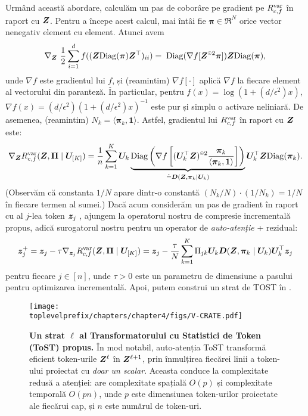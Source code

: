 \documentclass[../../book-main_ro.tex]{subfiles}
\begin{document}
Urmând această abordare, calculăm un pas de coborâre pe gradient pe $R_{c,f}^{\rm var}$ în raport cu $\bm{Z}$.
Pentru a începe acest calcul, mai întâi fie $\bm \pi \in \Re^N$ orice vector nenegativ element cu element. Atunci avem
\begin{equation}\label{eq1:grad Rcf}
\nabla_{\Z} \ \frac{1}{2} \sum_{i = 1}^{d} f(  (\Z \mathrm{Diag}(\bm \pi) \Z^{\top} )_{ii}) %
= \; \mathrm{Diag}(\nabla f[ \Z^{\hada 2} \bm \pi] ) \Z \mathrm{Diag}(\bm \pi),
\end{equation}
unde $\nabla f$ este gradientul lui $f$, și (reamintim) $\nabla f[\cdot]$ aplică $\nabla f$ la fiecare element al vectorului din paranteză. În particular, pentru $ f(x) = \log(1 + (d/\epsilon^{2}) x)$, $\nabla f(x) = (d / \epsilon^{2}) (1+ (d / \epsilon^{2}) x)^{-1}$ este pur și simplu o activare neliniară. De asemenea, (reamintim) $N_{k} = \langle \bm \pi_{k}, \bm 1\rangle$. Astfel, gradientul lui $R^{\rm var}_{c,f}$ în raport cu $\bm{Z}$ este:
\begin{align}\label{eq2:grad Rcf}
    \nabla_{\Z} R^{\rm var}_{c,f}(\Z,\bm \Pi \mid \bm U_{[K]}) =  \frac{1}{n}
    \sum_{k=1}^K \bm U_{k} \underbrace{\mathrm{Diag} \left( \nabla f\left[ (\bm
    U_{k}^{\top} \Z)^{\hada 2}  \frac{\bm \pi_k}{\langle \bm \pi_{k}, \bm 1\rangle} \right] \right)}_{\doteq \bm D(\Z, \bm \pi_{k} \mid \bm U_{k})} \bm U_{k}^{\top} \Z \mathrm{Diag}(\bm \pi_k).
\end{align}
(Observăm că constanta $1/N$ apare dintr-o constantă $(N_{k}/N)\cdot (1/N_{k}) = 1/N$ în fiecare termen al sumei.) Dacă acum considerăm un pas de gradient în raport cu al $j$-lea token $\bm{z}_j$
, ajungem la operatorul nostru de compresie incrementală propus, adică surogatorul nostru pentru un operator de \textit{auto-atenție} + rezidual:
\vspace{-2mm}
\begin{equation}\label{eq:layer-operation-orig}
    \bm{z}_j^+ = \bm{z}_{j} - \tau \nabla_{\bm{z}_{j}}R_{c, f}^{\rm var}(\bm{Z}, \bm \Pi \mid \bm U_{[K]}) = \bm{z}_j - \frac{\tau}{N} \sum_{k=1}^K \Pi_{jk} \bm U_{k} \bm D(\bm{Z}, \bm \pi_{k} \mid \bm U_{k}) \bm U_{k}^{\top} \bm{z}_j
\end{equation}
pentru fiecare \(j \in [n]\), unde $\tau > 0$ este un parametru de dimensiune a pasului pentru optimizarea incrementală. Apoi, putem construi un strat de TOST în .

\begin{figure}[t]
    \centering \texttt{[image: \\toplevelprefix/chapters/chapter4/figs/V-CRATE.pdf]}
    \vspace{-1mm}
    \caption{\small \textbf{Un strat $\ell$ al Transformatorului cu Statistici de Token (ToST) propus.} În mod notabil, auto-atenția ToST transformă eficient token-urile $\bm{Z}^{\ell}$ în $\bm{Z}^{\ell+1}$, prin înmulțirea fiecărei linii a token-ului proiectat cu \textit{doar un scalar}. Aceasta conduce la complexitate redusă a atenției: are complexitate spațială $O(p)$ și complexitate temporală $O(pn)$, unde $p$ este dimensiunea token-urilor proiectate ale fiecărui cap, și $n$ este numărul de token-uri.
    }
    \label{fig:vcrate-architecture}
\end{figure}
\end{document}
